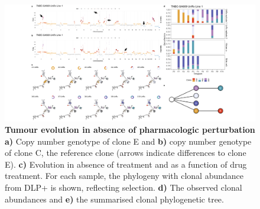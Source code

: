\begin{figure}
\centering
\includegraphics[width=\textwidth]{Figures/chap4/genePlotsa609mix.png}
	
\caption[Tumour evolution in absence of pharmacologic perturbation]
	{\small
	\textbf{Tumour evolution in absence of pharmacologic perturbation}
	    \textbf{a)} Copy number genotype of clone E and \textbf{b)} copy number genotype of clone C, the reference clone (arrows indicate differences to clone E).  
	    \textbf{c)}  Evolution in absence of treatment and as a function of drug treatment. For each sample, the phylogeny with clonal abundance from DLP+ is shown, reflecting selection. \textbf{d)} The observed clonal abundances and \textbf{e)} the summarised clonal phylogenetic tree.}
	\label{fig:genotype609mix}
\end{figure}

